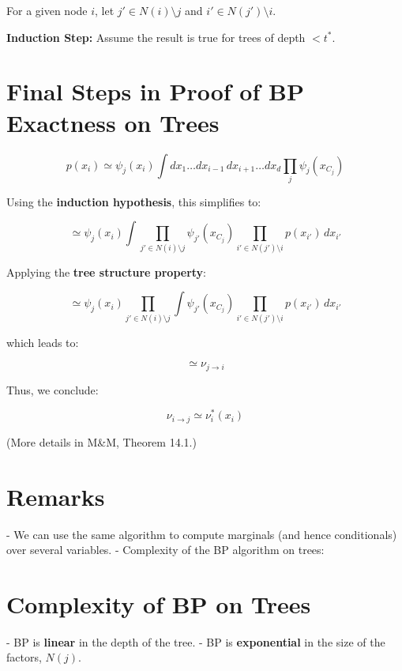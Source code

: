 \documentclass{article}%
\begin{document}

For a given node \( i \), let \( j' \in N(i) \setminus j \) and \( i' \in N(j') \setminus i \).

\textbf{Induction Step:} Assume the result is true for trees of depth \( < t^* \).



\section*{Final Steps in Proof of BP Exactness on Trees}

\[
p(x_i) \simeq \psi_j(x_i) \int dx_1 \dots dx_{i-1} \, dx_{i+1} \dots dx_d \prod_j \psi_j(x_{C_j})
\]

Using the \textbf{induction hypothesis}, this simplifies to:

\[
\simeq \psi_j(x_i) \int \prod_{j' \in N(i) \setminus j} \psi_{j'}(x_{C_j}) 
\prod_{i' \in N(j') \setminus i} p(x_{i'}) \, dx_{i'}
\]

Applying the \textbf{tree structure property}:

\[
\simeq \psi_j(x_i) \prod_{j' \in N(i) \setminus j} \int 
\psi_{j'}(x_{C_j}) \prod_{i' \in N(j') \setminus i} p(x_{i'}) \, dx_{i'}
\]

which leads to:

\[
\simeq \nu_{j \to i}
\]

Thus, we conclude:

\[
\nu_{i \to j} \simeq \nu_i^*(x_i)
\]

(More details in M\&M, Theorem 14.1.)

\section*{Remarks}

- We can use the same algorithm to compute marginals (and hence conditionals) over several variables.
- Complexity of the BP algorithm on trees:



\section*{Complexity of BP on Trees}

- BP is \textbf{linear} in the depth of the tree.
- BP is \textbf{exponential} in the size of the factors, \( N(j) \).
\end{document}
